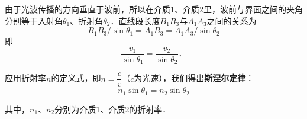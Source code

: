 由于光波传播的方向垂直于波前，所以在介质1、介质2里，波前与界面之间的夹角分别等于入射角$\theta_1$、折射角$\theta_2$．直线段长度$B_{1}B_{3}$与$A_{1}A_{3}$之间的关系为
\begin{equation}
B_{1}B_{3}/\sin \theta _{1}=A_{1}B_{3}=A_{1}A_{3}/\sin \theta _{2}
\end{equation}
即
\begin{equation}
{\frac  {v_{1}}{\sin \theta _{1}}}={\frac  {v_{2}}{\sin \theta _{2}}}．
\end{equation}

应用折射率$n$的定义式，即$n {=}\dfrac{c}{v}$（$c$为光速），我们得出\textbf{斯涅尔定律}：
\begin{equation}
n_1\sin\theta_1=n_2\sin\theta_2
\end{equation}

其中，$n_{1}$、$n_{2}$分别为介质1、介质2的折射率．